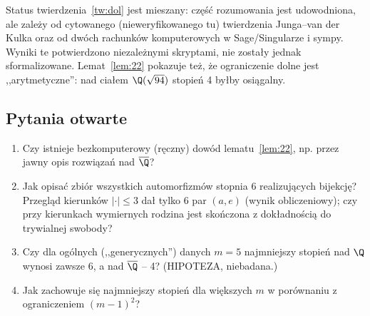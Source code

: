 \begin{uwaga}
Status twierdzenia~\ref{tw:dol} jest mieszany: część rozumowania jest udowodniona, ale zależy
od cytowanego (nieweryfikowanego tu) twierdzenia Junga--van der Kulka oraz od dwóch rachunków
komputerowych w Sage/Singularze i sympy. Wyniki te potwierdzono niezależnymi skryptami, nie
zostały jednak sformalizowane. Lemat~\ref{lem:22} pokazuje też, że ograniczenie dolne jest
,,arytmetyczne'': nad ciałem $\Q(\sqrt{94})$ stopień 4 byłby osiągalny.
\end{uwaga}

\subsection*{Pytania otwarte}
\begin{enumerate}
\item Czy istnieje bezkomputerowy (ręczny) dowód lematu~\ref{lem:22}, np. przez jawny
opis rozwiązań nad $\overline{\Q}$?
\item Jak opisać zbiór wszystkich automorfizmów stopnia 6 realizujących bijekcję? Przegląd
kierunków $|\cdot|\le3$ dał tylko 6 par $(a,e)$ (wynik obliczeniowy); czy przy kierunkach
wymiernych rodzina jest skończona z dokładnością do trywialnej swobody?
\item Czy dla ogólnych (,,generycznych'') danych $m=5$ najmniejszy stopień nad $\Q$ wynosi
zawsze 6, a nad $\overline{\Q}$ -- 4? (HIPOTEZA, niebadana.)
\item Jak zachowuje się najmniejszy stopień dla większych $m$ w porównaniu z ograniczeniem
$(m-1)^2$?
\end{enumerate}
